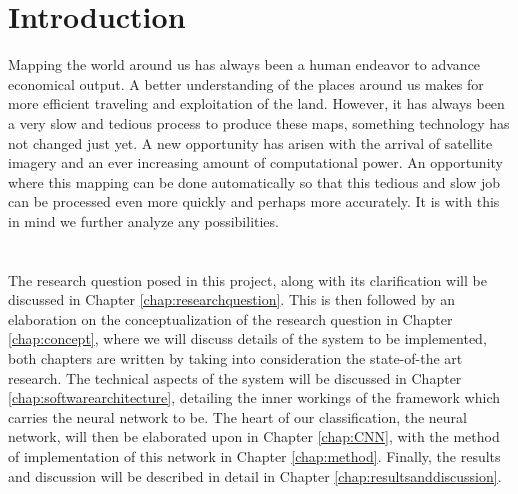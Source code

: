 \documentclass[a4paper,onecolumn]{report}
\begin{document}

{\small \tableofcontents}


\chapter{Introduction}

Mapping the world around us has always been a human endeavor to advance economical output. A better understanding of the places around us makes for more efficient traveling and exploitation of the land. However, it has always been a very slow and tedious process to produce these maps, something technology has not changed just yet. A new opportunity has arisen with the arrival of satellite imagery and an ever increasing amount of computational power. An opportunity where this mapping can be done automatically so that this tedious and slow job can be processed even more quickly and perhaps more accurately. It is with this in mind we further analyze any possibilities.\\
\\\\
The research question posed in this project, along with its clarification will be discussed in Chapter \ref{chap:researchquestion}. This is then followed by an elaboration on the conceptualization of the research question in Chapter \ref{chap:concept}, where we will discuss details of the system to be implemented, both chapters are written by taking into consideration the state-of-the art research.  The technical aspects of the system will be discussed in Chapter \ref{chap:softwarearchitecture}, detailing the inner workings of the framework which carries the neural network to be. The heart of our classification, the neural network, will then be elaborated upon in Chapter \ref{chap:CNN}, with the method of implementation of this network in Chapter \ref{chap:method}. Finally, the results and discussion will be described in detail in Chapter \ref{chap:resultsanddiscussion}.
\end{document}
